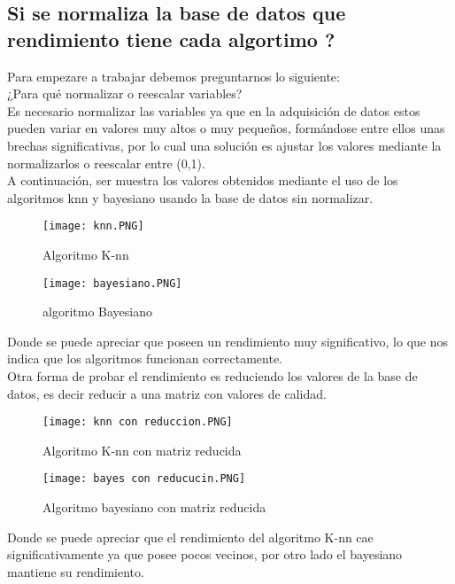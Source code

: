 \documentclass[10pt,a4paper]{article}
\begin{document}
\subsection{Si se normaliza la base de datos que rendimiento tiene cada algortimo ?}
Para empezare a trabajar debemos preguntarnos lo siguiente:\\ ¿Para qué normalizar o reescalar variables?\\
Es necesario normalizar las variables ya que en la adquisición de datos estos pueden variar en valores muy altos o muy pequeños, formándose entre ellos unas brechas significativas, por lo cual una solución es ajustar los valores mediante la  normalizarlos o reescalar entre  (0,1).\\
A continuación, ser muestra los valores obtenidos mediante el uso de los algoritmos knn y bayesiano usando la base de datos sin normalizar.
\begin{multicols}{2}
\begin{figure}[H]
\centering
\texttt{[image: knn.PNG]}
\caption{Algoritmo K-nn}
\end{figure}
\begin{figure}[H]
\centering
\texttt{[image: bayesiano.PNG]}
\caption{algoritmo Bayesiano}
\end{figure}
\end{multicols}
Donde se puede apreciar que poseen un rendimiento muy significativo, lo que nos indica que los algoritmos funcionan correctamente.\\
Otra forma de probar el rendimiento es reduciendo los valores de la base de datos, es decir reducir a una matriz con valores de calidad.\\
\begin{multicols}{2}
\begin{figure}[H]
\centering
\texttt{[image: knn con reduccion.PNG]}
\caption{Algoritmo K-nn con matriz reducida}
\end{figure}
\begin{figure}[H]
\centering
\texttt{[image: bayes con reducucin.PNG]}
\caption{Algoritmo bayesiano con matriz reducida}
\end{figure}
\end{multicols}
Donde se puede apreciar que el rendimiento del algoritmo K-nn cae significativamente ya que posee pocos vecinos, por otro lado el bayesiano mantiene su rendimiento.\\
\end{document}
